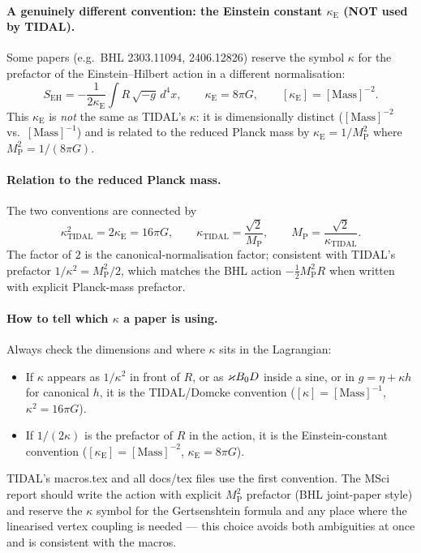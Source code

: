 \paragraph*{A genuinely different convention: the Einstein constant
$\kappa_\text{E}$ (NOT used by TIDAL).}
Some papers (e.g.\ BHL 2303.11094, 2406.12826) reserve the symbol $\kappa$ for
the prefactor of the Einstein--Hilbert action in a different normalisation:
\begin{equation*}
    S_\text{EH} = -\frac{1}{2\kappa_\text{E}}\!\int\! R\,\sqrt{-g}\, d^4x,
    \qquad
    \kappa_\text{E} = 8\pi G,
    \qquad
    [\kappa_\text{E}] = [\text{Mass}]^{-2}.
\end{equation*}
This $\kappa_\text{E}$ is \emph{not} the same as TIDAL's $\kappa$: it is
dimensionally distinct ($[\text{Mass}]^{-2}$ vs.\ $[\text{Mass}]^{-1}$) and is
related to the reduced Planck mass by $\kappa_\text{E} = 1/M_\text{P}^2$ where
$M_\text{P}^2 = 1/(8\pi G)$.

\paragraph*{Relation to the reduced Planck mass.}
The two conventions are connected by
\begin{equation*}
    \kappa^2_\text{TIDAL} = 2\kappa_\text{E} = 16\pi G,
    \qquad
    \kappa_\text{TIDAL} = \frac{\sqrt{2}}{M_\text{P}},
    \qquad
    M_\text{P} = \frac{\sqrt{2}}{\kappa_\text{TIDAL}}.
\end{equation*}
The factor of $2$ is the canonical-normalisation factor; consistent with
TIDAL's prefactor $1/\kappa^2 = M_\text{P}^2/2$, which matches the BHL action
$-\tfrac{1}{2}M_\text{P}^2 R$ when written with explicit Planck-mass prefactor.

\paragraph*{How to tell which $\kappa$ a paper is using.}
Always check the dimensions and where $\kappa$ sits in the Lagrangian:
\begin{itemize}
  \item If $\kappa$ appears as $1/\kappa^2$ in front of $R$, or as $\varkappa B_0 D$
        inside a sine, or in $g = \eta + \kappa h$ for canonical $h$, it is
        the TIDAL/Domcke convention ($[\kappa] = [\text{Mass}]^{-1}$,
        $\kappa^2 = 16\pi G$).
  \item If $1/(2\kappa)$ is the prefactor of $R$ in the action, it is the
        Einstein-constant convention ($[\kappa_\text{E}] = [\text{Mass}]^{-2}$,
        $\kappa_\text{E} = 8\pi G$).
\end{itemize}
TIDAL's macros.tex and all docs/tex files use the first convention. The MSci
report should write the action with explicit $M_\text{P}^2$ prefactor (BHL
joint-paper style) and reserve the $\kappa$ symbol for the Gertsenshtein
formula and any place where the linearised vertex coupling is needed — this
choice avoids both ambiguities at once and is consistent with the macros.

